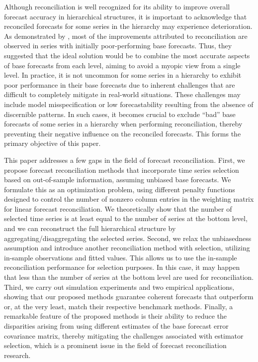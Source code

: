\documentclass[11pt,a4paper,]{article}
\begin{document}
Although reconciliation is well recognized for its ability to improve
overall forecast accuracy in hierarchical structures, it is important to
acknowledge that reconciled forecasts for some series in the hierarchy
may experience deterioration. As demonstrated by
\textcite{Athanasopoulos2017-jj}, most of the improvements attributed to
reconciliation are observed in series with initially poor-performing
base forecasts. Thus, they suggested that the ideal solution would be to
combine the most accurate aspects of base forecasts from each level,
aiming to avoid a myopic view from a single level. In practice, it is
not uncommon for some series in a hierarchy to exhibit poor performance
in their base forecasts due to inherent challenges that are difficult to
completely mitigate in real-world situations. These challenges may
include model misspecification or low forecastability resulting from the
absence of discernible patterns. In such cases, it becomes crucial to
exclude ``bad'' base forecasts of some series in a hierarchy when
performing reconciliation, thereby preventing their negative influence
on the reconciled forecasts. This forms the primary objective of this
paper.

This paper addresses a few gaps in the field of forecast reconciliation.
First, we propose forecast reconciliation methods that incorporate time
series selection based on out-of-sample information, assuming unbiased
base forecasts. We formulate this as an optimization problem, using
different penalty functions designed to control the number of nonzero
column entries in the weighting matrix for linear forecast
reconciliation. We theoretically show that the number of selected time
series is at least equal to the number of series at the bottom level,
and we can reconstruct the full hierarchical structure by
aggregating/disaggregating the selected series. Second, we relax the
unbiasedness assumption and introduce another reconciliation method with
selection, utilizing in-sample observations and fitted values. This
allows us to use the in-sample reconciliation performance for selection
purposes. In this case, it may happen that less than the number of
series at the bottom level are used for reconciliation. Third, we carry
out simulation experiments and two empirical applications, showing that
our proposed methods guarantee coherent forecasts that outperform or, at
the very least, match their respective benchmark methods. Finally, a
remarkable feature of the proposed methods is their ability to reduce
the disparities arising from using different estimates of the base
forecast error covariance matrix, thereby mitigating the challenges
associated with estimator selection, which is a prominent issue in the
field of forecast reconciliation research.
\end{document}
